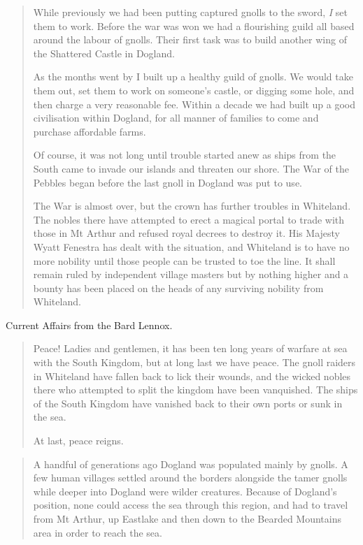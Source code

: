 \begin{multicols}{2}
\begin{quotation}
	While previously we had been putting captured gnolls to the sword, \emph{I} set them to work.  Before the war was won we had a flourishing guild all based around the labour of gnolls.  Their first task was to build another wing of the Shattered Castle in Dogland.

	As the months went by I built up a healthy guild of gnolls.  We would take them out, set them to work on someone's castle, or digging some hole, and then charge a very reasonable fee.  Within a decade we had built up a good civilisation within Dogland, for all manner of families to come and purchase affordable farms.

	Of course, it was not long until trouble started anew as ships from the South came to invade our islands and threaten our shore.  The War of the Pebbles began before the last gnoll in Dogland was put to use.

	The War is almost over, but the crown has further troubles in Whiteland.  The nobles there have attempted to erect a magical portal to trade with those in Mt Arthur and refused royal decrees to destroy it.  His Majesty Wyatt Fenestra has dealt with the situation, and Whiteland is to have no more nobility until those people can be trusted to toe the line.  It shall remain ruled by independent village masters but by nothing higher and a bounty has been placed on the heads of any surviving nobility from Whiteland.

\end{quotation}

Current Affairs from the Bard Lennox.

\begin{quotation}

Peace!  Ladies and gentlemen, it has been ten long years of warfare at sea with the South Kingdom, but at long last we have peace.  The gnoll raiders in Whiteland have fallen back to lick their wounds, and the wicked nobles there who attempted to split the kingdom have been vanquished.  The ships of the South Kingdom have vanished back to their own ports or sunk in the sea.

	At last, peace reigns.

\end{quotation}

\begin{quotation}

A handful of generations ago Dogland was populated mainly by gnolls.  A few human villages settled around the borders alongside the tamer gnolls while deeper into Dogland were wilder creatures.  Because of Dogland's position, none could access the sea through this region, and had to travel from Mt Arthur, up Eastlake and then down to the Bearded Mountains area in order to reach the sea.


\end{quotation}
\end{multicols}
